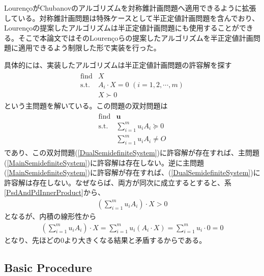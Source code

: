Louren\c{c}oがChubanovのアルゴリズムを対称錐計画問題へ適用できるように拡張している\cite*{SymmetricCone}。対称錐計画問題は特殊ケースとして半正定値計画問題を含んでおり、Louren\c{c}oの提案したアルゴリズムは半正定値計画問題にも使用することができる。そこで本論文ではそのLouren\c{c}oらの提案したアルゴリズムを半正定値計画問題に適用できるよう制限した形で実装を行った。

具体的には、実装したアルゴリズムは半正定値計画問題の許容解を探す
\begin{align} \label{MainSemidefiniteSystem}
  \begin{array}{ll}
    \text{find} & X \\
    \text{s.t.} & A_i \cdot X = 0 \,\, (i = 1, 2, \cdots, m) \\
                & X \succ 0
  \end{array}
\end{align}
という主問題を解いている。この問題の双対問題は
\begin{align} \label{DualSemidefiniteSystem}
  \begin{array}{ll}
    \text{find} & \mathbf{u} \\
    \text{s.t.} & \displaystyle{\sum_{i = 1}^m} u_i A_i \succeq 0 \\
                & \displaystyle{\sum_{i = 1}^m} u_i A_i \not= O
  \end{array}
\end{align}
であり、この双対問題(\ref{DualSemidefiniteSystem})に許容解が存在すれば、主問題(\ref{MainSemidefiniteSystem})に許容解は存在しない。逆に主問題(\ref{MainSemidefiniteSystem})に許容解が存在すれば、(\ref{DualSemidefiniteSystem})に許容解は存在しない。なぜならば、両方が同次に成立するとすると、系\ref{PsdAndPdInnerProduct}から、
\begin{align*}
  \left(\displaystyle{\sum_{i = 1}^m} u_i A_i\right) \cdot X > 0
\end{align*}
となるが、内積の線形性から
\begin{align*}
  \left(\displaystyle{\sum_{i = 1}^m} u_i A_i\right) \cdot X = \displaystyle{\sum_{i = 1}^m} u_i \left(A_i \cdot X\right)
                                                             = \displaystyle{\sum_{i = 1}^m} u_i \cdot 0
                                                             = 0
\end{align*}
となり、先ほどの$0$より大きくなる結果と矛盾するからである。

\subsection{Basic Procedure}

